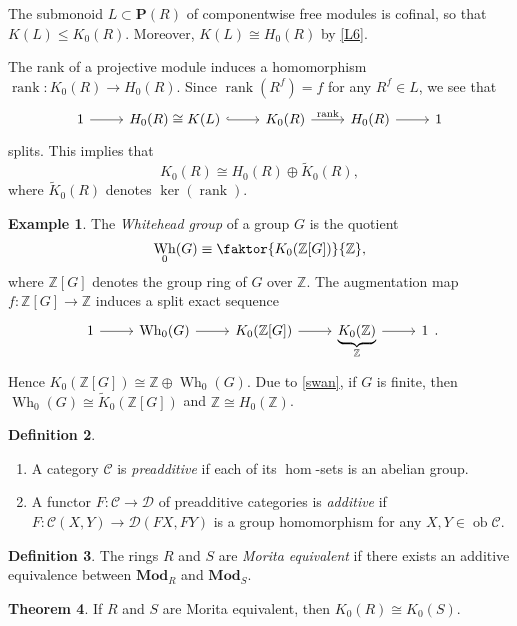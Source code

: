 \documentclass[10pt,letterpaper,cm]{nupset}
\theoremstyle{definition}
\newtheorem{definition}{Definition}[section]
\newtheorem{exmp}[definition]{Example}
\theoremstyle{theorem}
\newtheorem{theorem}[definition]{Theorem}
\theoremstyle{remark}
\renewcommand{\P}{\mathbf P}
\newcommand{\Z}{\mathbb Z}
\newcommand{\1}{\mathbf{1}}
\renewcommand{\c}{\mathscr{C}}
\renewcommand{\d}{\mathscr{D}}
\newcommand{\0}{\vec 0}
\DeclareMathOperator{\ob}{ob}
\DeclareMathOperator{\rank}{rank}
\DeclareMathOperator{\wh}{Wh}
\begin{document}
The submonoid $L\subset \P(R)$ of componentwise free modules is cofinal, so that $K(L) \leq K_0(R)$. Moreover, $K(L) \cong H_0(R)$ by \cref{L6}.

The rank of a projective module induces a homomorphism $\rank: K_0(R) \to H_0(R)$. Since $\rank(R^f) = f$ for any $R^f \in L$, we see that
\[
\begin{tikzcd}
1 \arrow[r] & H_0(R) \cong K(L) \arrow[r, hook] & K_0(R) \arrow[r, "\rank"] & H_0(R) \arrow[r] & 1
\end{tikzcd}
\]
splits. This implies that $$K_0(R) \cong H_0(R) \oplus \widetilde{K}_0(R),$$ where $\widetilde{K}_0(R)$ denotes $\ker(\rank)$.


\begin{exmp}
The \textit{Whitehead group} of a group $G$ is the quotient $$\wh_0(G) \equiv \faktor{K_0(\Z[G])}{\Z},$$ where $\Z[G]$ denotes the group ring of $G$ over $\Z$. The augmentation map $f: \Z[G] \to \Z$ induces a split exact sequence 
\[
\begin{tikzcd}
1 \arrow[r] & \wh_0(G) \arrow[r] & K_0(\Z[G]) \arrow[r] & \underbrace{K_0(\Z)}_{\Z} \arrow[r] & 1
\end{tikzcd}.
\]
 Hence $K_0(\Z[G]) \cong \Z \oplus \wh_0(G)$. Due to \cref{swan}, if $G$ is finite, then $\wh_0(G) \cong \widetilde{K}_0(\Z[G])$  and $\Z \cong H_0(\Z)$. 
\end{exmp}

\smallskip

\begin{definition} $ $
\begin{enumerate}
\item A category $\c$ is \textit{preadditive} if each of its $\hom$-sets is an abelian group.
\item A functor $F: \c \to \d$ of preadditive categories is \textit{additive} if $F: \c(X, Y) \to \d(FX, FY)$ is a group homomorphism for any $X, Y \in \ob \c$.
\end{enumerate}
\end{definition}

\begin{definition}
The rings $R$ and $S$ are \textit{Morita equivalent} if there exists an additive equivalence between $\mathbf{Mod}_R$ and $\mathbf{Mod}_S$. 
\end{definition}

\begin{theorem}
If $R$ and $S$ are Morita equivalent, then $K_0(R) \cong K_0(S)$.
\end{theorem}
\end{document}
